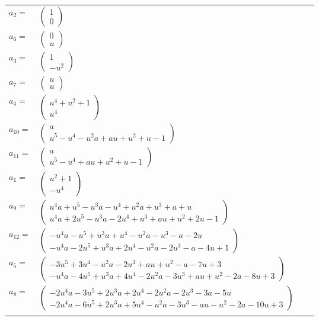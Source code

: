 \documentclass[1p]{elsarticle_modified}
\theoremstyle{definition}
\begin{document}
\begin{tabular}{m{7pt} m{180pt} m{7pt} m{180pt} }
\flushright $a_{2}=$&$\begin{pmatrix}1\\0\end{pmatrix}$ \\
\flushright $a_{6}=$&$\begin{pmatrix}0\\u\end{pmatrix}$ \\
\flushright $a_{3}=$&$\begin{pmatrix}1\\- u^2\end{pmatrix}$ \\
\flushright $a_{7}=$&$\begin{pmatrix}u\\u\end{pmatrix}$ \\
\flushright $a_{4}=$&$\begin{pmatrix}u^4+u^2+1\\u^4\end{pmatrix}$ \\
\flushright $a_{10}=$&$\begin{pmatrix}a\\u^5- u^4- u^2 a+a u+u^2+u-1\end{pmatrix}$ \\
\flushright $a_{11}=$&$\begin{pmatrix}a\\u^5- u^4+a u+u^2+u-1\end{pmatrix}$ \\
\flushright $a_{1}=$&$\begin{pmatrix}u^2+1\\- u^4\end{pmatrix}$ \\
\flushright $a_{9}=$&$\begin{pmatrix}u^4 a+u^5- u^3 a- u^4+u^2 a+u^3+a+u\\u^4 a+2 u^5- u^3 a-2 u^4+u^3+a u+u^2+2 u-1\end{pmatrix}$ \\
\flushright $a_{12}=$&$\begin{pmatrix}- u^4 a- u^5+u^3 a+u^4- u^2 a- u^3- a-2 u\\- u^4 a-2 u^5+u^3 a+2 u^4- u^2 a-2 u^3- a-4 u+1\end{pmatrix}$ \\
\flushright $a_{5}=$&$\begin{pmatrix}-3 u^5+3 u^4- u^2 a-2 u^3+a u+u^2- a-7 u+3\\- u^4 a-4 u^5+u^3 a+4 u^4-2 u^2 a-3 u^3+a u+u^2-2 a-8 u+3\end{pmatrix}$ \\
\flushright $a_{8}=$&$\begin{pmatrix}-2 u^4 a-3 u^5+2 u^3 a+2 u^4-2 u^2 a-2 u^3-3 a-5 u\\-2 u^4 a-6 u^5+2 u^3 a+5 u^4- u^2 a-3 u^3- a u- u^2-2 a-10 u+3\end{pmatrix}$\\&\end{tabular}
\end{document}

